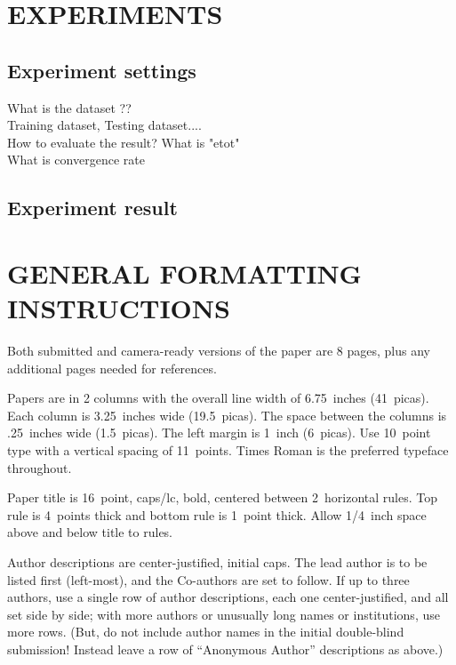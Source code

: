 \documentclass[twoside]{article}
\begin{document}
\section{EXPERIMENTS}


\subsection{Experiment settings}

	
What is the dataset ??\\
Training dataset, Testing dataset.... \\

How to evaluate the result?
What is "etot" \\
What is convergence rate \\

	

\subsection{Experiment result}



\section{GENERAL FORMATTING INSTRUCTIONS}



Both submitted and camera-ready versions of the paper are 8 pages,
plus any additional pages needed for references.

Papers are in 2 columns with the overall line width of 6.75~inches (41~picas). Each column is 3.25~inches wide (19.5~picas).  The space
between the columns is .25~inches wide (1.5~picas).  The left margin is 1~inch (6~picas).  Use 10~point type with a vertical spacing of
11~points. Times Roman is the preferred typeface throughout.

Paper title is 16~point, caps/lc, bold, centered between 2~horizontal rules.  Top rule is 4~points thick and bottom rule is 1~point thick.
Allow 1/4~inch space above and below title to rules.

Author descriptions are center-justified, initial caps.  The lead
author is to be listed first (left-most), and the Co-authors are set
to follow.  If up to three authors, use a single row of author
descriptions, each one center-justified, and all set side by side;
with more authors or unusually long names or institutions, use more
rows.  (But, do not include author names in the initial double-blind
submission!  Instead leave a row of ``Anonymous Author'' descriptions
as above.)
\end{document}
